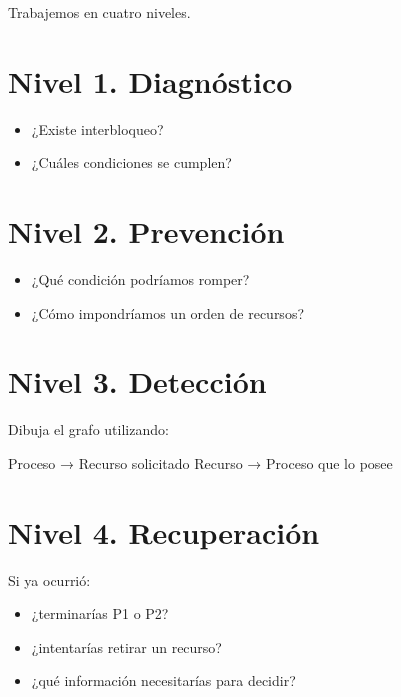 \documentclass[
  spanish,
  letterpaper,
]{scrbook}
\newenvironment{Shaded}{\begin{snugshade}}{\end{snugshade}}
\newcommand{\NormalTok}[1]{\textcolor[rgb]{0.00,0.23,0.31}{#1}}
\providecommand{\tightlist}{%
  \setlength{\itemsep}{0pt}\setlength{\parskip}{0pt}}
\begin{document}
Trabajemos en cuatro niveles.

\section{Nivel 1. Diagnóstico}\label{nivel-1.-diagnuxf3stico}

\begin{itemize}
\tightlist
\item
  ¿Existe interbloqueo?
\item
  ¿Cuáles condiciones se cumplen?
\end{itemize}

\section{Nivel 2. Prevención}\label{nivel-2.-prevenciuxf3n}

\begin{itemize}
\tightlist
\item
  ¿Qué condición podríamos romper?
\item
  ¿Cómo impondríamos un orden de recursos?
\end{itemize}

\section{Nivel 3. Detección}\label{nivel-3.-detecciuxf3n}

Dibuja el grafo utilizando:

\begin{Shaded}
\begin{Highlighting}[]
\NormalTok{Proceso → Recurso solicitado}
\NormalTok{Recurso → Proceso que lo posee}
\end{Highlighting}
\end{Shaded}

\section{Nivel 4. Recuperación}\label{nivel-4.-recuperaciuxf3n}

Si ya ocurrió:

\begin{itemize}
\tightlist
\item
  ¿terminarías P1 o P2?
\item
  ¿intentarías retirar un recurso?
\item
  ¿qué información necesitarías para decidir?
\end{itemize}
\end{document}
